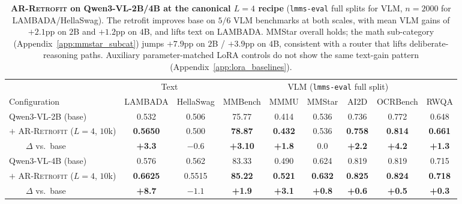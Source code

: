 \documentclass{article}
\newcommand{\retrofit}{\textsc{AR-Retrofit}}
\begin{document}
\begin{table}[t]
\caption{\textbf{\retrofit{} on Qwen3-VL-2B/4B at the canonical $L{=}4$ recipe} (\texttt{lmms-eval} full splits for VLM, $n{=}2000$ for LAMBADA/HellaSwag). The retrofit improves base on $5/6$ VLM benchmarks at both scales, with mean VLM gains of $+2.1$pp on $2$B and $+1.2$pp on $4$B, and lifts text on LAMBADA. MMStar overall holds; the math sub-category (Appendix~\ref{app:mmstar_subcat}) jumps $+7.9$pp on $2$B / $+3.9$pp on $4$B, consistent with a router that lifts deliberate-reasoning paths. Auxiliary parameter-matched LoRA controls do not show the same text-gain pattern (Appendix~\ref{app:lora_baselines}).}
\label{tab:retrofit_main}
\centering\small
\setlength{\tabcolsep}{4pt}
\begin{tabular}{lcccccccc}
\toprule
& \multicolumn{2}{c}{Text} & \multicolumn{6}{c}{VLM (\texttt{lmms-eval} full split)} \\
\cmidrule(lr){2-3}\cmidrule(lr){4-9}
Configuration & LAMBADA & HellaSwag & MMBench & MMMU & MMStar & AI2D & OCRBench & RWQA \\
\midrule
Qwen3-VL-2B (base)                    & 0.532 & 0.506 & 75.77 & 0.414 & 0.536 & 0.736 & 0.772 & 0.648 \\
$+$ \retrofit{} ($L{=}4$, $10$k)      & \textbf{0.5650} & 0.500   & \textbf{78.87} & \textbf{0.432} & 0.536 & \textbf{0.758} & \textbf{0.814} & \textbf{0.661} \\
~~~~$\Delta$ vs.\ base                & \textbf{+3.3}   & $-0.6$  & \textbf{+3.10} & \textbf{+1.8} & $0.0$  & \textbf{+2.2}  & \textbf{+4.2}  & \textbf{+1.3}  \\
\midrule
Qwen3-VL-4B (base)                    & 0.576 & 0.562 & 83.33 & 0.490 & 0.624 & 0.819 & 0.819 & 0.715 \\
$+$ \retrofit{} ($L{=}4$, $10$k)      & \textbf{0.6625} & 0.5515 & \textbf{85.22} & \textbf{0.521} & \textbf{0.632} & \textbf{0.825} & \textbf{0.824} & \textbf{0.718} \\
~~~~$\Delta$ vs.\ base                & \textbf{+8.7}   & $-1.1$ & \textbf{+1.9}  & \textbf{+3.1}  & \textbf{+0.8}  & \textbf{+0.6}  & \textbf{+0.5}  & \textbf{+0.3}  \\
\bottomrule
\end{tabular}
\end{table}
\end{document}
